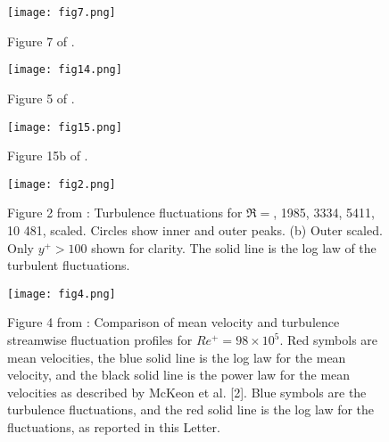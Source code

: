 \documentclass[11pt]{article}
\begin{document}
\begin{figure}[ht]
\begin{center}
\texttt{[image: fig7.png]}\\
\end{center}
\caption{Figure 7 of \cite{bernardini_etal2014}.}
\label{fig:fluctuations}
\end{figure}

\begin{figure}[ht]
\begin{center}
\texttt{[image: fig14.png]}\\
\end{center}
\caption{Figure 5 of \cite{bernardini_etal2014}.}
\label{fig:pe}
\end{figure}

\begin{figure}[ht]
\begin{center}
\texttt{[image: fig15.png]}\\
\end{center}
\caption{Figure 15b of \cite{bernardini_etal2014}.}
\label{fig:spec}
\end{figure}

\begin{figure}[ht]
\begin{center}
\texttt{[image: fig2.png]}\\
\end{center}
\caption{Figure 2 from \cite{hultmark_etal201}: Turbulence fluctuations for $\Re =$, 1985, 3334, 5411, 10 481, scaled. Circles show inner and outer peaks. (b) Outer scaled. Only $y^+ > 100$ shown for clarity. The solid line is the log law of the turbulent fluctuations.}
\label{fig:turb_vel}
\end{figure}


\begin{figure}[ht]
\begin{center}
\texttt{[image: fig4.png]}\\
\end{center}
\caption{Figure 4 from \cite{hultmark_etal2012}: Comparison of mean velocity and turbulence streamwise fluctuation profiles for $Re^+ = 98 \times10^5$. Red symbols are mean velocities, the blue solid line is the log law for the mean velocity, and the black solid line is the power law for the mean velocities as described by McKeon et al. [2]. Blue symbols are the turbulence fluctuations, and the red solid line is the log law for the fluctuations, as reported in this Letter.}
\label{fig:mean_turb_vel}
\end{figure}




\end{document}
